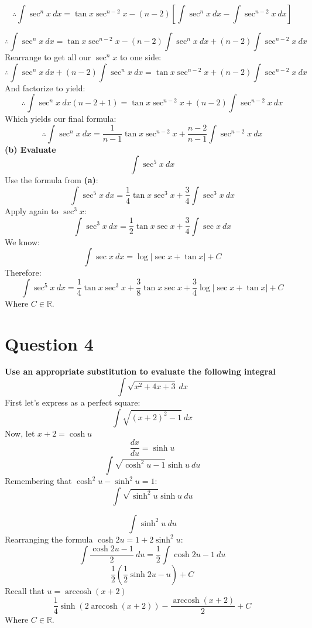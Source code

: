 \documentclass[12pt]{article}
\DeclareMathOperator{\arccosh}{arccosh}
\begin{document}
$$
\therefore \int \sec^n x \ dx = \tan x \sec^{n-2} x - (n-2) \left[ \int \sec^n x \ dx - \int \sec^{n-2} x \ dx \right]
$$

$$
\therefore \int \sec^n x \ dx = \tan x \sec^{n-2} x - (n-2)\int \sec^n x \ dx + (n-2)\int \sec^{n-2} x \ dx
$$
Rearrange to get all our $\sec^n x$ to one side:
$$
\therefore \int \sec^n x \ dx + (n-2)\int \sec^n x \ dx  = \tan x \sec^{n-2} x + (n-2)\int \sec^{n-2} x \ dx
$$
And factorize to yield:
$$
\therefore \int \sec^n x \ dx (n-2+1) = \tan x \sec^{n-2} x + (n-2)\int \sec^{n-2} x \ dx
$$
Which yields our final formula:
$$
\therefore \int \sec^n x \ dx = \frac{1}{n-1}\tan x \sec^{n-2} x + \frac{n-2}{n-1}\int \sec^{n-2} x \ dx
$$
\textbf{(b) Evaluate}\\
$$
\int \sec^5 x \ dx
$$
Use the formula from \textbf{(a)}:
$$
\int \sec^5 x \ dx= \frac{1}{4}\tan x \sec^3 x + \frac{3}{4}\int \sec^3 x \ dx
$$
Apply again to $\sec^3 x$:
$$
\int \sec^3 x \ dx= \frac{1}{2}\tan x \sec x + \frac{3}{4}\int \sec x \ dx
$$
We know:
$$
\int \sec x \ dx = \log |\sec x + \tan x | + C
$$
Therefore:
$$
\int \sec^5 x \ dx = \frac{1}{4}\tan x \sec^3 x + \frac{3}{8}\tan x \sec x + \frac{3}{4}\log |\sec x + \tan x | + C
$$
Where $C \in \mathbb{R}$.
\section*{Question 4}
\textbf{Use an appropriate substitution to evaluate the following integral}
$$
\int \sqrt{x^2+4x+3} \ dx
$$
First let's express as a perfect square:
$$
\int \sqrt{(x+2)^2-1} \ dx
$$
Now, let $x+2=\cosh u$
$$
\frac{dx}{du}=\sinh u
$$
$$
\int \sqrt{\cosh^2 u -1} \sinh u \ du
$$
Remembering that $\cosh^2 u - \sinh^2 u=1$:
$$
\int \sqrt{\sinh^2 u} \sinh u \ du
$$

$$
\int \sinh^2 u \ du
$$
Rearranging the formula $\cosh 2u = 1 + 2\sinh^2 u$:
$$
\int \frac{\cosh 2u -1}{2} \ du = \frac{1}{2}\int \cosh 2u -1 \ du
$$
$$
\frac{1}{2}\left( \frac{1}{2}\sinh 2u - u \right)+C
$$
Recall that $u=\arccosh(x+2)$\\
$$
\frac{1}{4}\sinh (2\arccosh(x+2))-\frac{\arccosh(x+2)}{2}+C
$$
Where $C \in \mathbb{R}$.
\end{document}
